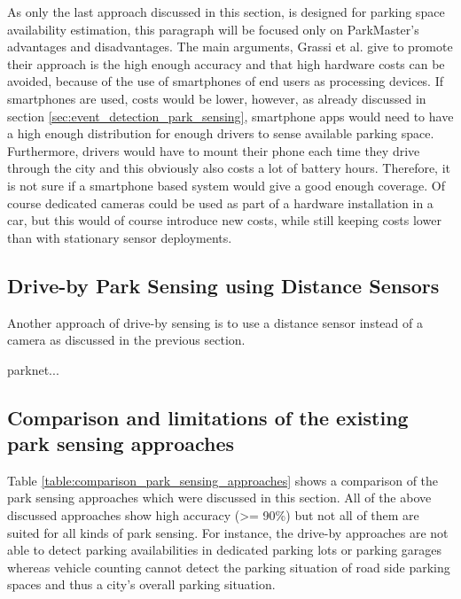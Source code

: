 As only the last approach discussed in this section, is designed for parking space availability estimation, this paragraph will be focused only on ParkMaster's advantages and disadvantages. The main arguments, Grassi et al. give to promote their approach is the high enough accuracy and that high hardware costs can be avoided, because of the use of smartphones of end users as processing devices. If smartphones are used, costs would be lower, however, as already discussed in section \ref{sec:event_detection_park_sensing}, smartphone apps would need to have a high enough distribution for enough drivers to sense available parking space. Furthermore, drivers would have to mount their phone each time they drive through the city and this obviously also costs a lot of battery hours. Therefore, it is not sure if a smartphone based system would give a good enough coverage. Of course dedicated cameras could be used as part of a hardware installation in a car, but this would of course introduce new costs, while still keeping costs lower than with stationary sensor deployments.





\subsection{Drive-by Park Sensing using Distance Sensors}
\label{sec:related_driveby_park_sensing_distance}

Another approach of drive-by sensing is to use a distance sensor instead of a camera as discussed in the previous section. 

parknet... \cite{Mathur:2010:PDS:1814433.1814448}


\subsection{Comparison and limitations of the existing park sensing approaches}

Table \ref{table:comparison_park_sensing_approaches} shows a comparison of the park sensing approaches which were discussed in this section. All of the above discussed approaches show high accuracy (>= 90\%) but not all of them are suited for all kinds of park sensing. For instance, the drive-by approaches are not able to detect parking availabilities in dedicated parking lots or parking garages whereas vehicle counting cannot detect the parking situation of road side parking spaces and thus a city's overall parking situation. 

